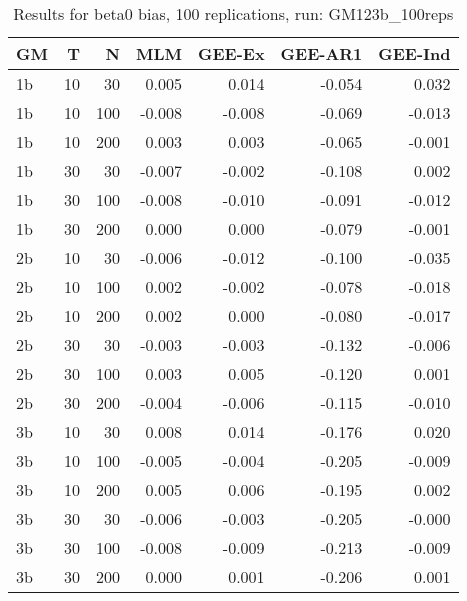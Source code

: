 \begin{table}[ht]
\centering
\begin{tabular}{lrrrrrr}
  \hline
GM & T & N & MLM & GEE-Ex & GEE-AR1 & GEE-Ind \\ 
  \hline
1b & 10 & 30 & 0.005 & 0.014 & -0.054 & 0.032 \\ 
  1b & 10 & 100 & -0.008 & -0.008 & -0.069 & -0.013 \\ 
  1b & 10 & 200 & 0.003 & 0.003 & -0.065 & -0.001 \\ 
  1b & 30 & 30 & -0.007 & -0.002 & -0.108 & 0.002 \\ 
  1b & 30 & 100 & -0.008 & -0.010 & -0.091 & -0.012 \\ 
  1b & 30 & 200 & 0.000 & 0.000 & -0.079 & -0.001 \\ 
   \hline
2b & 10 & 30 & -0.006 & -0.012 & -0.100 & -0.035 \\ 
  2b & 10 & 100 & 0.002 & -0.002 & -0.078 & -0.018 \\ 
  2b & 10 & 200 & 0.002 & 0.000 & -0.080 & -0.017 \\ 
  2b & 30 & 30 & -0.003 & -0.003 & -0.132 & -0.006 \\ 
  2b & 30 & 100 & 0.003 & 0.005 & -0.120 & 0.001 \\ 
  2b & 30 & 200 & -0.004 & -0.006 & -0.115 & -0.010 \\ 
   \hline
3b & 10 & 30 & 0.008 & 0.014 & -0.176 & 0.020 \\ 
  3b & 10 & 100 & -0.005 & -0.004 & -0.205 & -0.009 \\ 
  3b & 10 & 200 & 0.005 & 0.006 & -0.195 & 0.002 \\ 
  3b & 30 & 30 & -0.006 & -0.003 & -0.205 & -0.000 \\ 
  3b & 30 & 100 & -0.008 & -0.009 & -0.213 & -0.009 \\ 
  3b & 30 & 200 & 0.000 & 0.001 & -0.206 & 0.001 \\ 
   \hline
\end{tabular}
\caption{Results for beta0 bias, 100 replications, run: GM123b_100reps} 
\label{tab:beta0_bias}
\end{table}
